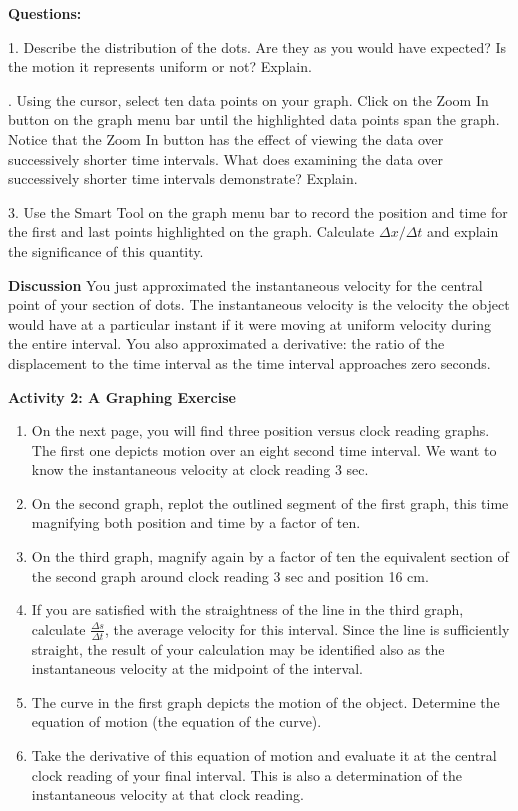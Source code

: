\medskip

{\noindent \bf Questions:}

1. Describe the distribution of the dots. Are they as you would have expected?
Is the motion it represents uniform or not? Explain. 
\answerspace{20mm}

. Using the cursor, select ten data points on your graph. Click on the Zoom
In button on the graph menu bar until the highlighted data points span the graph.
Notice that the Zoom In button has the effect of viewing the data over successively
shorter time intervals. What does examining the data over successively shorter
time intervals demonstrate? Explain.
\answerspace{20mm}

3. Use the Smart Tool on the graph menu bar to record the position and time
for the first and last points highlighted on the graph. Calculate \( \Delta x/\Delta t \)
and explain the significance of this quantity.
\answerspace{20mm}

{\noindent \bf Discussion} You just approximated the instantaneous velocity for the central point of your section of dots. The instantaneous velocity is the velocity the object would have at a particular instant if it were moving at uniform velocity during the entire interval. You also approximated a derivative: the ratio of the displacement to the time interval as the time interval approaches zero seconds. 

{\noindent \bf Activity 2: A Graphing Exercise} \begin{enumerate}

\item On the next page, you will find three position versus clock reading graphs. The first one depicts motion over an eight second time interval. We want to know the instantaneous velocity at clock reading 3 sec.

\item On the second graph, replot the outlined segment of the first graph, this time magnifying both position and time by a factor of ten.

\item On the third graph, magnify again by a factor of ten the equivalent section of the second graph around clock reading 3 sec and position 16 cm. 

\item If you are satisfied with the straightness of the line in the third graph, calculate $\frac{\Delta s}{\Delta t}$, the average velocity for this interval. Since the line is sufficiently straight, the result of your calculation may be identified also as the instantaneous velocity at the midpoint of the interval.

\item The curve in the first graph depicts the motion of the object. Determine the equation of motion (the equation of the curve).

\item Take the derivative of this equation of motion and evaluate it at the central clock reading of your final interval. This is also a determination of the instantaneous velocity at that clock reading.

\end{enumerate}

